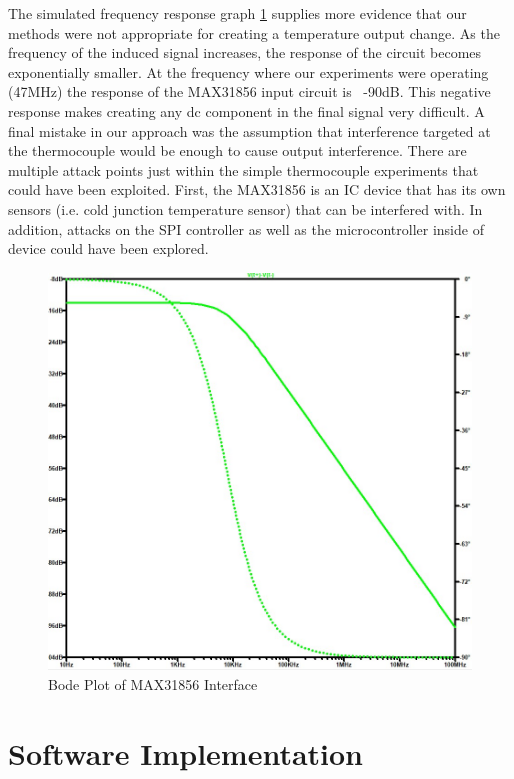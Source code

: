 The simulated frequency response graph \cref{fig:BODE} supplies more evidence that our methods were not appropriate for creating a temperature output change. As the frequency of the induced signal increases, the response of the circuit becomes exponentially smaller. At the frequency where our experiments were operating (47MHz) the response of the MAX31856 input circuit is ~-90dB. This negative response makes creating any \ac{dc} component in the final signal very difficult.
A final mistake in our approach was the assumption that interference targeted at the thermocouple would be enough to cause output interference. There are multiple attack points just within the simple thermocouple experiments that could have been exploited. First, the MAX31856 is an IC device that has its own sensors (i.e. cold junction temperature sensor) that can be interfered with. In addition, attacks on the SPI controller as well as the microcontroller inside of device could have been explored.

\begin{figure}
    \centering
    \includegraphics[width=\linewidth]{pictures/Bode.jpg}
    \caption{Bode Plot of MAX31856 Interface}
    \label{fig:BODE}
\end{figure}

\section{Software Implementation}\label{swi}
